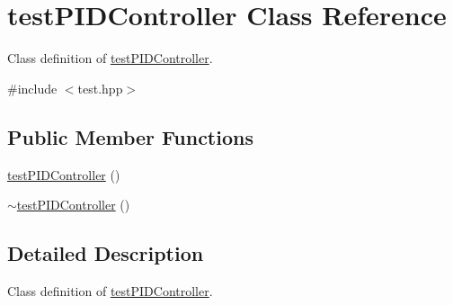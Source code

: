 \hypertarget{classtestPIDController}{\section{test\-P\-I\-D\-Controller Class Reference}
\label{classtestPIDController}
}


Class definition of \hyperlink{classtestPIDController}{test\-P\-I\-D\-Controller}.  




{\ttfamily \#include $<$test.\-hpp$>$}

\subsection*{Public Member Functions}
\begin{DoxyCompactItemize}
\item 
\hyperlink{classtestPIDController_a3111bf8595cdf8f39e4926cb3f27db0c}{test\-P\-I\-D\-Controller} ()
\item 
\hyperlink{classtestPIDController_a692e60c5f700230dc3b84ab5832d475c}{$\sim$test\-P\-I\-D\-Controller} ()
\end{DoxyCompactItemize}


\subsection{Detailed Description}
Class definition of \hyperlink{classtestPIDController}{test\-P\-I\-D\-Controller}. 

